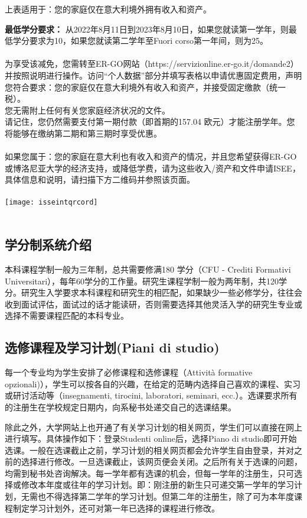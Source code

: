 上表适用于：您的家庭仅在意大利境外拥有收入和资产。


\textbf{最低学分要求：}
从2022年8月11日到2023年8月10日，如果您就读第一学年，则最低学分要求为10，如果您就读第二学年至Fuori corso第一年间，则为25。\\
\\
为享受该减免，您需转至ER-GO网站（https://servizionline.er-go.it/domande2）并按照说明进行操作。访问“个人数据”部分并填写表格以申请优惠固定费用，声明您符合要求：您的家庭仅在意大利境外有收入和资产，并接受固定缴款（统一税）。\\
您无需附上任何有关您家庭经济状况的文件。\\
请记住，您仍然需要支付第一期付款（即首期的157.04 欧元）才能注册学年。您将能够在缴纳第二期和第三期时享受优惠。\\
\\
如果您属于：您的家庭在意大利也有收入和资产的情况，并且您希望获得ER-GO或博洛尼亚大学的经济支持，或降低学费，请为这些收入/资产和文件申请ISEE，具体信息和说明，请扫描下方二维码并参照该页面。\\
\\
\texttt{[image: isseintqrcord]}\\
\\

\subsection{学分制系统介绍}
本科课程学制一般为三年制，总共需要修满180 学分（CFU - Crediti Formativi Universitari），每年60学分的工作量。研究生课程学制一般为两年制，共120学分。研究生入学要求本科课程和研究生的相匹配，如果缺少一些必修学分，往往会收到面试评估，面试过的话才能读研，否则需要选择其他灵活入学的研究生专业或选择不需要课程匹配的本科专业。 

\subsection{选修课程及学习计划(Piani di studio)}
每一个专业均为学生安排了必修课程和选修课程（Attività formative opzionali)），学生可以按各自的兴趣，在给定的范畴内选择自己喜欢的课程、实习或研讨活动等（insegnamenti, tirocini, laboratori, seminari, ecc.）。选课要求所有的注册生在学校规定日期内，向系秘书处递交自己的选课结果。

除此之外，大学网站上也开通了有关学习计划的相关网页，学生们可以直接在网上进行填写。具体操作如下：登录Studenti online后，选择Piano di studio即可开始选课。一般在选课截止之前，学习计划的相关网页都会允许学生自由登录，并对之前的选择进行修改。一旦选课截止，该网页便会关闭。之后所有关于选课的问题，均需到秘书处咨询解决。每一学年都有选课的机会，但每一学年的注册生，只可选择或修改本年度或往年的学习计划。即：刚注册的新生只可递交第一学年的学习计划，无需也不得选择第二学年的学习计划。但第二年的注册生，除了可为本年度课程制定学习计划外，还可对第一年已选择的课程进行修改。

